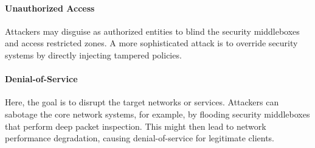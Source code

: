 
\paragraph{Unauthorized Access}
Attackers may disguise as authorized entities to blind the security middleboxes and
access restricted zones. 
A more sophisticated attack is to override security systems by directly injecting 
tampered policies.

\paragraph{Denial-of-Service}
Here, the goal is to disrupt the target networks or services. Attackers can sabotage the core network 
systems, for example, by flooding security middleboxes that perform deep packet inspection.
This might then lead to network performance degradation, causing 
denial-of-service for legitimate clients.


